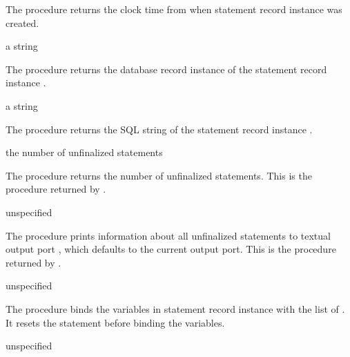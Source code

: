 The  procedure returns the clock time from
 when statement record instance  was
created.

\begin{procedure}
\end{procedure}
\returns{} a string

The  procedure returns the database record
instance of the statement record instance .

\begin{procedure}
\end{procedure}
\returns{} a string

The  procedure returns the SQL string of the
statement record instance .

\begin{procedure}
\end{procedure}
\returns{} the number of unfinalized statements

The  procedure returns the number of unfinalized
statements.
This is the procedure returned by .

\begin{procedure}
\end{procedure}
\returns{} unspecified

The  procedure prints information about all
unfinalized statements to textual output port , which defaults
to the current output port.
This is the procedure returned by .

\begin{procedure}
\end{procedure}
\returns{} unspecified

The  procedure binds the variables in statement
record instance  with the list of . It resets
the statement before binding the variables.

\begin{procedure}
\end{procedure}
\returns{} unspecified

